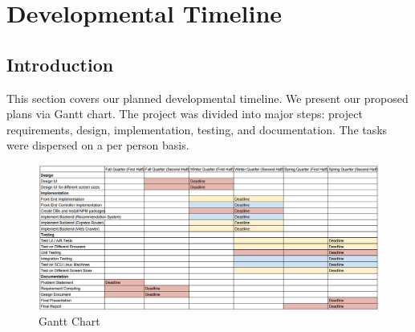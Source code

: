 \chapter{Developmental Timeline}

\section{Introduction}
This section covers our planned developmental timeline. We present our proposed plans via Gantt chart. The project was divided into major steps: project requirements, design, implementation, testing, and documentation. The tasks were dispersed on a per person basis. 

\begin{figure}[!ht]
	\centering
    \includegraphics[angle=270,origin=c,width=.5\textwidth]{gantt}
    \caption{Gantt Chart}
\end{figure}